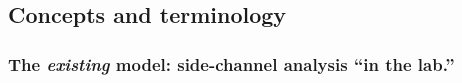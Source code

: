 
\subsection{Concepts and terminology}


\subsubsection{The {\em existing} model: side-channel analysis ``in the lab.'' }

%
%
%
%
%
%
%
%
